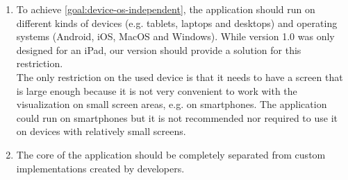 \begin{enumerate}[label=\textbf{OR \arabic*}., ref=OR \arabic*, labelindent=0.5cm, leftmargin=*]
	\item \label{or:device-os-independent}
		To achieve \ref{goal:device-os-independent}, the application should run on different kinds of devices (e.g. tablets, laptops and desktops) and operating systems (Android, iOS, MacOS and Windows). While version 1.0 was only designed for an iPad, our version should provide a solution for this restriction.\\
	
	The only restriction on the used device is that it needs to have a screen that is large enough because it is not very convenient to work with the visualization on small screen areas, e.g. on smartphones. The application could run on smartphones but it is not recommended nor required to use it on devices with relatively small screens.
	
	\item \label{item:code-separation}
		The core of the application should be completely separated from custom implementations created by developers.

\end{enumerate}


